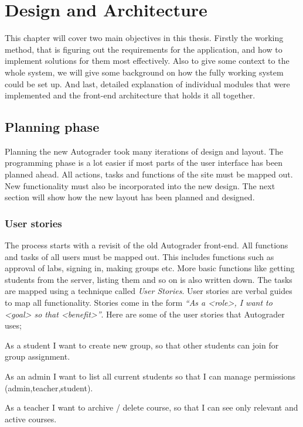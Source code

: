 \chapter{Design and Architecture}
This chapter will cover two main objectives in this thesis. Firstly the working method, that is figuring out the requirements for the application, and how to implement solutions for them most effectively. Also to give some context to the whole system, we will give some background on how the fully working system could be set up. And last, detailed explanation of individual modules that were implemented and the front-end architecture that holds it all together.

\section{Planning phase}
Planning the new Autograder took many iterations of design and layout. The programming phase is a lot easier if most parts of the user interface has been planned ahead. All actions, tasks and functions of the site must be mapped out. New functionality must also be incorporated into the new design. The next section will show how the new layout has been planned and designed.

\subsection{User stories}
The process starts with a revisit of the old Autograder front-end. All functions and tasks of all users must be mapped out. This includes functions such as approval of labs, signing in, making groups etc. More basic functions like getting students from the server, listing them and so on is also written down. The tasks are mapped using a technique called \emph{User Stories}. User stories are verbal guides to map all functionality. Stories come in the form \emph{``As a <role>, I want to <goal> so that <benefit>''}. Here are some of the user stories that Autograder uses;

\begin{itemize*}
\item As a student I want to create new group, so that other students can join for group assignment.
\item As an admin I want to list all current students so that I can manage permissions (admin,teacher,student).
\item As a teacher I want to archive / delete course, so that I can see only relevant and active courses.
\end{itemize*}

